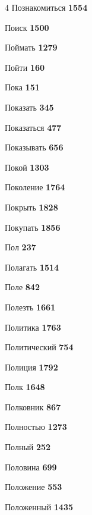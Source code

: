 \begin{multicols}{4}
\noindent Познакомиться \dotfill \textbf{\color{secondary} 1554}\par
\noindent Поиск \dotfill \textbf{\color{secondary} 1500}\par
\noindent Поймать \dotfill \textbf{\color{secondary} 1279}\par
\noindent Пойти \dotfill \textbf{\color{secondary} 160}\par
\noindent Пока \dotfill \textbf{\color{secondary} 151}\par
\noindent Показать \dotfill \textbf{\color{secondary} 345}\par
\noindent Показаться \dotfill \textbf{\color{secondary} 477}\par
\noindent Показывать \dotfill \textbf{\color{secondary} 656}\par
\noindent Покой \dotfill \textbf{\color{secondary} 1303}\par
\noindent Поколение \dotfill \textbf{\color{secondary} 1764}\par
\noindent Покрыть \dotfill \textbf{\color{secondary} 1828}\par
\noindent Покупать \dotfill \textbf{\color{secondary} 1856}\par
\noindent Пол \dotfill \textbf{\color{secondary} 237}\par
\noindent Полагать \dotfill \textbf{\color{secondary} 1514}\par
\noindent Поле \dotfill \textbf{\color{secondary} 842}\par
\noindent Полезть \dotfill \textbf{\color{secondary} 1661}\par
\noindent Политика \dotfill \textbf{\color{secondary} 1763}\par
\noindent Политический \dotfill \textbf{\color{secondary} 754}\par
\noindent Полиция \dotfill \textbf{\color{secondary} 1792}\par
\noindent Полк \dotfill \textbf{\color{secondary} 1648}\par
\noindent Полковник \dotfill \textbf{\color{secondary} 867}\par
\noindent Полностью \dotfill \textbf{\color{secondary} 1273}\par
\noindent Полный \dotfill \textbf{\color{secondary} 252}\par
\noindent Половина \dotfill \textbf{\color{secondary} 699}\par
\noindent Положение \dotfill \textbf{\color{secondary} 553}\par
\noindent Положенный \dotfill \textbf{\color{secondary} 1435}\par

\end{multicols}
